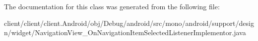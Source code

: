 The documentation for this class was generated from the following file\+:\begin{DoxyCompactItemize}
\item 
client/client/client.\+Android/obj/\+Debug/android/src/mono/android/support/design/widget/Navigation\+View\+\_\+\+On\+Navigation\+Item\+Selected\+Listener\+Implementor.\+java\end{DoxyCompactItemize}
